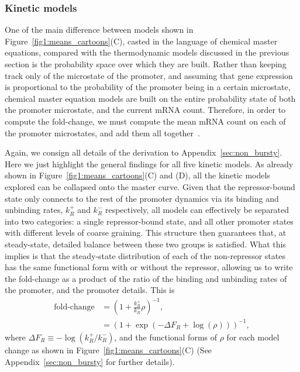 \subsubsection{Kinetic models}
One of the main difference between models shown in
Figure~\ref{fig1:means_cartoons}(C), casted in the language of chemical master
equations, compared with the thermodynamic models discussed in the previous 
section is the probability space over which they are built. Rather than keeping
track only of the microstate of the promoter, and assuming that gene expression
is proportional to the probability of the promoter being in a certain
microstate, chemical master equation models are built on the entire probability
state of both the promoter microstate, and the current mRNA count. Therefore, in
order to compute the fold-change, we must compute the mean mRNA count on each of
the promoter microstates, and add them all together~\cite{Sanchez2013}.

Again, we consign all details of the derivation to Appendix~\ref{sec:non_bursty}.
Here we just highlight the general findings for all five kinetic models. As
already shown in Figure~\ref{fig1:means_cartoons}(C) and (D), all the kinetic
models explored can be collapsed onto the master curve. Given that the
repressor-bound state only connects to the rest of the promoter dynamics via its
binding and unbinding rates, $k_R^+$ and $k_R^-$ respectively, all models can
effectively be separated into two categories: a single repressor-bound state,
and all other promoter states with different levels of coarse graining. This
structure then guarantees that, at steady-state, detailed balance between these
two groups is satisfied. What this implies is that the steady-state distribution
of each of the non-repressor states has the same functional form with or without
the repressor, allowing us to write the fold-change as a product of the ratio of
the binding and unbinding rates of the promoter, and the promoter details. This
is 
\begin{align}
\text{fold-change} &= \left( 1 + \frac{k_R^+}{k_R^-} \rho \right)^{-1},\\
&= (1 + \exp(-\Delta F_R + \log(\rho) ))^{-1},
\end{align}
where $\Delta F_R \equiv -\log(k_R^+/k_R^-)$, and the functional forms of $\rho$
for each model change as shown in Figure~\ref{fig1:means_cartoons}(C) (See
Appendix~\ref{sec:non_bursty} for further details).

